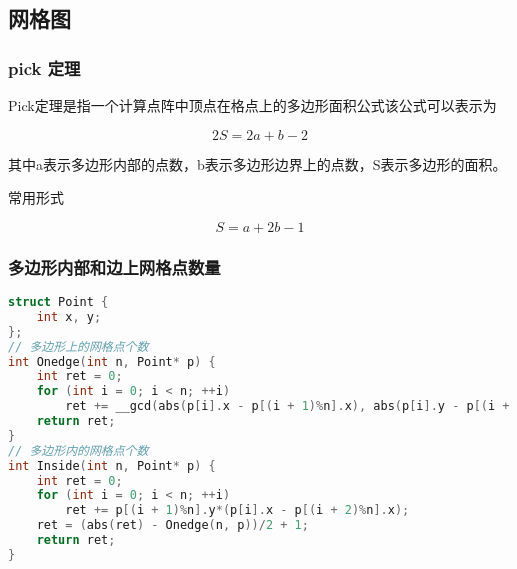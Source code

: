 \subsection{网格图}

\subsubsection{pick 定理}

Pick定理是指一个计算点阵中顶点在格点上的多边形面积公式该公式可以表示为

$$2S = 2a + b − 2$$

其中a表示多边形内部的点数，b表示多边形边界上的点数，S表示多边形的面积。

常用形式

$$S = a + 2b - 1$$

\subsubsection{多边形内部和边上网格点数量}

\begin{lstlisting}[language=C++]
struct Point {
    int x, y;
};
// 多边形上的网格点个数
int Onedge(int n, Point* p) {
    int ret = 0;
    for (int i = 0; i < n; ++i)
        ret += __gcd(abs(p[i].x - p[(i + 1)%n].x), abs(p[i].y - p[(i + 1)%n].y));
    return ret;
}
// 多边形内的网格点个数
int Inside(int n, Point* p) {
    int ret = 0;
    for (int i = 0; i < n; ++i)
        ret += p[(i + 1)%n].y*(p[i].x - p[(i + 2)%n].x);
    ret = (abs(ret) - Onedge(n, p))/2 + 1;
    return ret;
}
\end{lstlisting}
